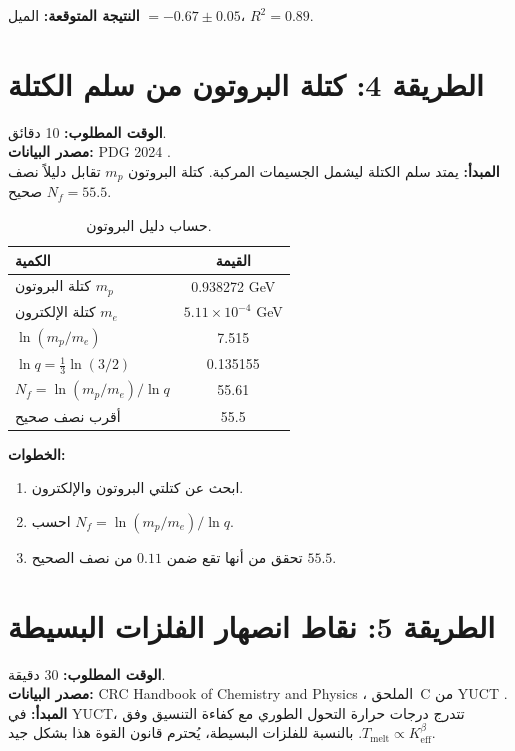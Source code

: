 \documentclass[12pt,a4paper]{article}
\newcommand{\Ke}{K_{\mathrm{eff}}}   %
\begin{document}
	\textbf{النتيجة المتوقعة:} الميل \(= -0.67 \pm 0.05\)، \(R^2 = 0.89\).
	
	\section{الطريقة 4: كتلة البروتون من سلم الكتلة}
	\label{sec:proton}
	
	\textbf{الوقت المطلوب:} 10 دقائق.\\
	\textbf{مصدر البيانات:} PDG 2024 \cite{PDG2024}.\\
	\textbf{المبدأ:} يمتد سلم الكتلة ليشمل الجسيمات المركبة. كتلة البروتون \(m_p\) تقابل دليلاً نصف صحيح \(N_f = 55.5\).
	
	\begin{table}[H]
		\centering
		\caption{حساب دليل البروتون.}
		\label{tab:proton}
		\begin{tabular}{l c}
			\toprule
			الكمية & القيمة \\
			\midrule
			كتلة البروتون \(m_p\) & 0.938272 GeV \\
			كتلة الإلكترون \(m_e\) & \(5.11\times10^{-4}\) GeV \\
			\(\ln(m_p/m_e)\) & 7.515 \\
			\(\ln q = \frac{1}{3}\ln(3/2)\) & 0.135155 \\
			\(N_f = \ln(m_p/m_e)/\ln q\) & 55.61 \\
			أقرب نصف صحيح & 55.5 \\
			\bottomrule
		\end{tabular}
	\end{table}
	
	\textbf{الخطوات:}
	\begin{enumerate}[label=(\arabic*)]
		\item ابحث عن كتلتي البروتون والإلكترون.
		\item احسب \(N_f = \ln(m_p / m_e) / \ln q\).
		\item تحقق من أنها تقع ضمن \(0.11\) من نصف الصحيح \(55.5\).
	\end{enumerate}
	
	\section{الطريقة 5: نقاط انصهار الفلزات البسيطة}
	\label{sec:melting}
	
	\textbf{الوقت المطلوب:} 30 دقيقة.\\
	\textbf{مصدر البيانات:} CRC Handbook of Chemistry and Physics \cite{CRC}، الملحق~C من YUCT \cite{AppendixC}.\\
	\textbf{المبدأ:} في YUCT، تتدرج درجات حرارة التحول الطوري مع كفاءة التنسيق وفق \(T_{\text{melt}} \propto \Ke^{\beta}\). بالنسبة للفلزات البسيطة، يُحترم قانون القوة هذا بشكل جيد.
	
\end{document}
